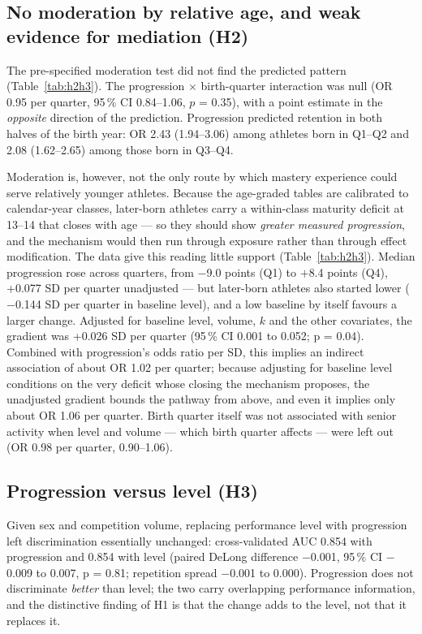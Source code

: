 \documentclass[12pt,a4paper]{article}
\begin{document}
\subsection{No moderation by relative age, and weak evidence for mediation (H2)}

The pre-specified moderation test did not find the predicted pattern (Table~\ref{tab:h2h3}). The progression $\times$ birth-quarter interaction was null (OR 0.95 per quarter, 95\,\% CI 0.84--1.06, $p$ = 0.35), with a point estimate in the \emph{opposite} direction of the prediction. Progression predicted retention in both halves of the birth year: OR 2.43 (1.94--3.06) among athletes born in Q1--Q2 and 2.08 (1.62--2.65) among those born in Q3--Q4.

Moderation is, however, not the only route by which mastery experience could serve relatively younger athletes. Because the age-graded tables are calibrated to calendar-year classes, later-born athletes carry a within-class maturity deficit at 13--14 that closes with age --- so they should show \emph{greater measured progression}, and the mechanism would then run through exposure rather than through effect modification. The data give this reading little support (Table~\ref{tab:h2h3}). Median progression rose across quarters, from $-$9.0 points (Q1) to $+$8.4 points (Q4), +0.077 SD per quarter unadjusted --- but later-born athletes also started lower ($-$0.144 SD per quarter in baseline level), and a low baseline by itself favours a larger change. Adjusted for baseline level, volume, $k$ and the other covariates, the gradient was +0.026 SD per quarter (95\,\% CI 0.001 to 0.052; p = 0.04). Combined with progression's odds ratio per SD, this implies an indirect association of about OR 1.02 per quarter; because adjusting for baseline level conditions on the very deficit whose closing the mechanism proposes, the unadjusted gradient bounds the pathway from above, and even it implies only about OR 1.06 per quarter. Birth quarter itself was not associated with senior activity when level and volume --- which birth quarter affects --- were left out (OR 0.98 per quarter, 0.90--1.06).

\subsection{Progression versus level (H3)}

Given sex and competition volume, replacing performance level with progression left discrimination essentially unchanged: cross-validated AUC 0.854 with progression and 0.854 with level (paired DeLong difference $-$0.001, 95\,\% CI $-$0.009 to 0.007, p = 0.81; repetition spread $-$0.001 to 0.000). Progression does not discriminate \emph{better} than level; the two carry overlapping performance information, and the distinctive finding of H1 is that the change adds to the level, not that it replaces it.
\end{document}
